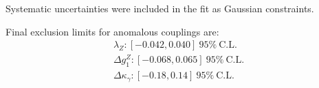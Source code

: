 

Systematic uncertainties were included in the fit as Gaussian
constraints.

Final exclusion limits for anomalous couplings are:
\begin{align}
  \lambda_{Z}: [-0.042,0.040]~95\%~\mathrm{C.L.}\\
  \Delta g^{Z}_1: [-0.068,0.065]~95\%~\mathrm{C.L.}\\
  \Delta\kappa_\gamma: [-0.18,0.14]~95\%~\mathrm{C.L.}\\
\end{align}

